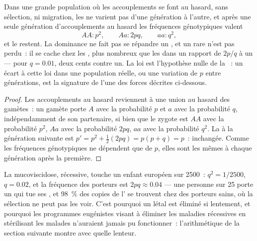\begin{theorem}\label{thm:b2:population-genetics:hw}
Dans une grande population où les accouplements se font au hasard, sans
sélection,  ni migration, les  ne varient
pas d'une génération à l'autre, et après une seule génération
d'accouplements au hasard les fréquences génotypiques valent
\[
AA : p^{2}, \qquad Aa : 2pq, \qquad aa : q^{2},
\]
et le restent. La dominance ne fait pas se répandre un  ,
et un   rare n'est pas perdu~: il se cache chez les
, plus nombreux que les  dans un rapport de
$2p/q$ à un --- pour $q = 0.01$, deux cents contre un. La loi est
l'hypothèse nulle de la ~: un écart à cette loi
dans une population réelle, ou une variation de
$p$ entre générations, est la signature de l'une des forces décrites
ci-dessous.
\end{theorem}
\begin{proof}
Les accouplements au hasard reviennent à une union au hasard des
gamètes~: un gamète porte $A$ avec la
probabilité $p$ et $a$ avec la probabilité $q$, indépendamment de son
partenaire, si bien que le zygote est $AA$ avec la probabilité $p^{2}$,
$Aa$ avec la probabilité
$2pq$, $aa$ avec la probabilité $q^{2}$. La  à la
génération suivante est $p' = p^{2} + \tfrac12(2pq) = p(p + q) = p$~:
inchangée. Comme les fréquences génotypiques ne dépendent que de $p$,
elles sont les mêmes à chaque génération après la première.
\end{proof}

\begin{example}\label{ex:b2:population-genetics:cf}
La mucoviscidose, récessive, touche un enfant européen sur 2500~:
$q^{2} = 1/2500$, $q = 0.02$, et la fréquence des porteurs est $2pq
\approx 0.04$ --- une personne sur 25 porte un  qui tue ses
, et \qty{98}{\%} des copies de l' se trouvent chez des
porteurs sains, où la sélection ne peut pas les voir. C'est pourquoi un
 létal est éliminé si lentement, et pourquoi les programmes
eugénistes visant à éliminer les maladies récessives en stérilisant les
malades n'auraient jamais pu fonctionner~: l'arithmétique de la section
suivante montre avec quelle lenteur.
\end{example}

